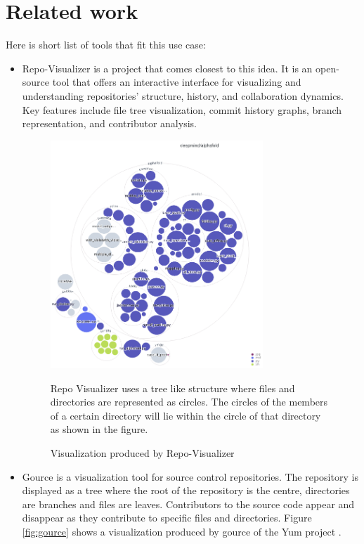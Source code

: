 \section{Related work}
Here is short list of tools that fit this use case:
\begin{itemize}
    \item Repo-Visualizer \cite{repovisualizer} is a project that comes closest to this idea. It is an open-source tool that offers an interactive interface for visualizing and understanding repositories' structure, history, and collaboration dynamics. Key features include file tree visualization, commit history graphs, branch representation, and contributor analysis.

    \begin{figure}[!htbp]
        \includegraphics[width=8cm]{figs/repo-visualizer_sample.png}
        \centering
        \caption{Visualization produced by Repo-Visualizer}
        \small
        Repo Visualizer uses a tree like structure where files and directories are represented as circles. The circles of the members of a certain directory will lie within the circle of that directory as shown in the figure.
        \label{fig:repo-visualizer}
    \end{figure}

    \item Gource \cite{gource} is a visualization tool for source control repositories. The repository is displayed as a tree where the root of the repository is the centre, directories are branches and files are leaves. Contributors to the source code appear and disappear as they contribute to specific files and directories. Figure \ref{fig:gource} shows a visualization produced by gource of the Yum project \cite{yum}.


\end{itemize}
